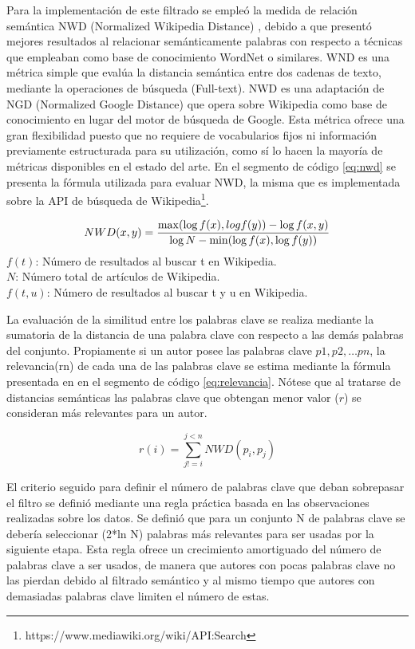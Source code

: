 \documentclass[conference]{IEEEtran}
\begin{document}
Para la implementación de este filtrado se empleó la medida de relación semántica NWD (Normalized Wikipedia Distance) \cite{schaefer2014normalized}, debido a que presentó mejores resultados al relacionar semánticamente palabras con respecto a técnicas que empleaban como base de conocimiento WordNet \cite{kilgarriff2000wordnet} o similares. WND es una métrica simple que evalúa la distancia semántica entre dos cadenas de texto, mediante la operaciones de búsqueda (Full-text). NWD es una adaptación de NGD (Normalized Google Distance) \cite{DBLP:journals/corr/abs-cs-0412098} que opera sobre Wikipedia como base de conocimiento en lugar del motor de búsqueda de Google. Esta métrica ofrece una gran flexibilidad puesto que no requiere de vocabularios fijos ni información previamente estructurada para su utilización, como sí lo hacen la mayoría de métricas disponibles en el estado del arte. En el segmento de código \ref{eq:nwd} se presenta la fórmula utilizada para evaluar NWD, la misma que es implementada sobre la API de búsqueda de Wikipedia\footnote{https://www.mediawiki.org/wiki/API:Search}.

\begin{equation} \label{eq:nwd}
NWD(x,y)  = \frac{\max(\log{f(x)},log{f(y)})-\log{f(x,y)}}{\log{N}-\min(\log{f(x)},\log{f(y)})} \\
\end{equation}
$f(t)$: Número de resultados al buscar t en Wikipedia.\\
$N$: Número total de artículos de Wikipedia.\\
$f(t,u)$: Número de resultados al buscar t y u en Wikipedia.


La evaluación de la similitud entre los palabras clave se realiza mediante la sumatoria de la distancia de una palabra clave con respecto a las demás palabras del conjunto. Propiamente si un autor posee las palabras clave $p1, p2, … pn$, la relevancia(rn) de cada una de las palabras clave se estima mediante la fórmula presentada en en el segmento de código \ref{eq:relevancia}. Nótese que al tratarse de distancias semánticas las palabras clave que obtengan menor valor ($r$) se consideran más relevantes para un autor.

\begin{equation}\label{eq:relevancia}
r(i) = \sum_{j!=i}^{j<n} NWD(p_i, p_j)
\end{equation}

El criterio seguido para definir el número de palabras clave que deban sobrepasar el filtro se definió mediante una regla práctica basada en las observaciones realizadas sobre los datos. Se definió que para un conjunto N de palabras clave se debería seleccionar (2*ln N) palabras más relevantes para ser usadas por la siguiente etapa. Esta regla ofrece un crecimiento amortiguado del número de palabras clave a ser usados, de manera que autores con pocas palabras clave no las pierdan debido al filtrado semántico y al mismo tiempo que autores con demasiadas palabras clave limiten el número de estas.
\end{document}

